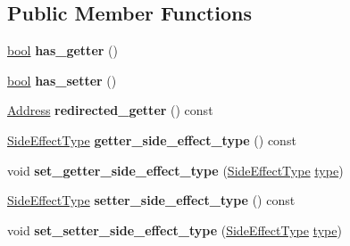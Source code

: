 \subsection*{Public Member Functions}
\begin{DoxyCompactItemize}
\item 
\mbox{\label{classv8_1_1internal_1_1AccessorInfo_a7819739d3765461abfd5abf0b24be4b0}} 
\mbox{\hyperlink{classbool}{bool}} {\bfseries has\+\_\+getter} ()
\item 
\mbox{\label{classv8_1_1internal_1_1AccessorInfo_ae85b482de034f9e2546235613faaa282}} 
\mbox{\hyperlink{classbool}{bool}} {\bfseries has\+\_\+setter} ()
\item 
\mbox{\label{classv8_1_1internal_1_1AccessorInfo_a2a44d60a6c999399bc786daadd50eaa5}} 
\mbox{\hyperlink{classuintptr__t}{Address}} {\bfseries redirected\+\_\+getter} () const
\item 
\mbox{\label{classv8_1_1internal_1_1AccessorInfo_aee70d695d1886be0bf3b751b0822cc78}} 
\mbox{\hyperlink{namespacev8_a29711319c2b9fc7716d65faee2f7b9cb}{Side\+Effect\+Type}} {\bfseries getter\+\_\+side\+\_\+effect\+\_\+type} () const
\item 
\mbox{\label{classv8_1_1internal_1_1AccessorInfo_a17a2f98f599bfca12ae98864bcd62a9f}} 
void {\bfseries set\+\_\+getter\+\_\+side\+\_\+effect\+\_\+type} (\mbox{\hyperlink{namespacev8_a29711319c2b9fc7716d65faee2f7b9cb}{Side\+Effect\+Type}} \mbox{\hyperlink{classstd_1_1conditional_1_1type}{type}})
\item 
\mbox{\label{classv8_1_1internal_1_1AccessorInfo_ad65b262a288c68b1d035a72a5eb41cb5}} 
\mbox{\hyperlink{namespacev8_a29711319c2b9fc7716d65faee2f7b9cb}{Side\+Effect\+Type}} {\bfseries setter\+\_\+side\+\_\+effect\+\_\+type} () const
\item 
\mbox{\label{classv8_1_1internal_1_1AccessorInfo_a3a9d365acf903d0ccbd2b0f28e3f3c64}} 
void {\bfseries set\+\_\+setter\+\_\+side\+\_\+effect\+\_\+type} (\mbox{\hyperlink{namespacev8_a29711319c2b9fc7716d65faee2f7b9cb}{Side\+Effect\+Type}} \mbox{\hyperlink{classstd_1_1conditional_1_1type}{type}})

\end{DoxyCompactItemize}
